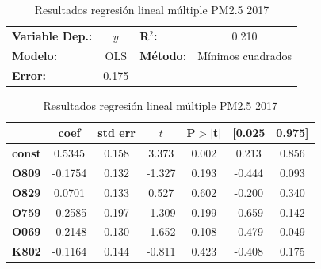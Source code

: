 \documentclass[3p,times]{elsarticle}
\begin{document}
\begin{table}[hbt!]
\caption{Resultados regresión lineal múltiple PM2.5 2017}
\label{tab:RRLM PM2.5 2017}
\begin{center}
\begin{tabular}{lclc}
\toprule
\textbf{Variable Dep.:}    &        $y$         & \textbf{  R$^2$:         } &     0.210   \\
\textbf{Modelo:}            &       OLS        & \textbf{Método:}           &  Mínimos cuadrados   \\
\textbf{Error:}            & 0.175  \\
\bottomrule
\end{tabular}
\begin{tabular}{lcccccc}
               & \textbf{coef} & \textbf{std err} & \textbf{$t$} & \textbf{P$> |$t$|$} & \textbf{[0.025} & \textbf{0.975]}  \\
\midrule
\textbf{const} &       0.5345  &        0.158     &     3.373  &         0.002        &        0.213    &        0.856     \\
\textbf{O809}  &      -0.1754  &        0.132     &    -1.327  &         0.193        &       -0.444    &        0.093     \\
\textbf{O829}  &       0.0701  &        0.133     &     0.527  &         0.602        &       -0.200    &        0.340     \\
\textbf{O759}  &      -0.2585  &        0.197     &    -1.309  &         0.199        &       -0.659    &        0.142     \\
\textbf{O069}  &      -0.2148  &        0.130     &    -1.652  &         0.108        &       -0.479    &        0.049     \\
\textbf{K802}  &      -0.1164  &        0.144     &    -0.811  &         0.423        &       -0.408    &        0.175     \\
\bottomrule
\end{tabular}
\end{center}
\end{table}
\end{document}
